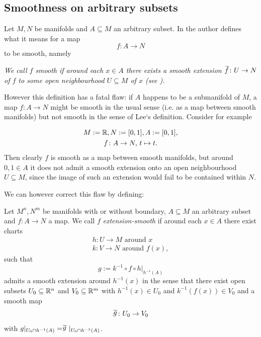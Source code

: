 \subsection{Smoothness on arbitrary subsets}

Let $M,N$ be manifolds and $A \subseteq M$ an arbitrary subset. In \cite{lee2011smooth} the author defines what it means for a map
\[
f \colon A \to N
\]
to be smooth, namely
\begin{center}
    \textit{We call $f$ smooth if around each $x \in A$ there exists a smooth extension $\oset[-1pt]{\sim}{f} \colon U \to N$ of $f$ to some open neighbourhood $U \subseteq M$ of $x$ (see \cite[p. 45]{lee2011smooth}).}
\end{center}
However this definition has a fatal flaw: if $A$ happens to be a submanifold of $M$, a map $f \colon A \to N$ might be smooth in the usual sense (i.e. as a map between smooth manifolds) but not smooth in the sense of Lee`s definition. Consider for example
\begin{counterexample}
    \label{ex:extension_smooth}
    \begin{gather*}
        M := \mathbb{R}, N:= [0,1], A := [0,1], \\
        f \colon A \to N, \, t \mapsto t.   
    \end{gather*}
    Then clearly $f$ is smooth as a map between smooth manifolds, but around $0,1 \in A$ it does not admit a smooth extension onto an open neighbourhood $U \subseteq M$, since the image of such an extension would fail to be contained within $N$. 
\end{counterexample}
We can however correct this flaw by defining:

\begin{definition}
    \label{def:extension_smooth}
    Let $M^n,N^m$ be manifolds with or without boundary, $A \subseteq M$ an arbitrary subset and $f \colon A \to N$ a map. We call $f$ \textit{extension-smooth} if around each $x \in A$ there exist charts
    \begin{gather*}
        h \colon U \to M \text{ around } x\\
        k \colon V \to N \text{ around } f(x),
    \end{gather*}
    such that
    \[
    g:= k^{-1} \circ f \circ h|_{h^{-1}(A)}
    \]
    admits a smooth extension around $h^{-1}(x)$ in the sense that there exist open subsets $U_0 \subseteq \mathbb{R}^n$ and $V_0 \subseteq \mathbb{R}^m$ with $h^{-1}(x) \in U_0$ and $k^{-1}(f(x)) \in V_0$ and a smooth map 
    \[
    \oset[-1pt]{\sim}{g} \colon U_0 \to V_0
    \]
    with $g|_{U_0 \cap h^{-1}(A)} = \oset[-1pt]{\sim}{g}|_{U_0 \cap h^{-1}(A)}$.
\end{definition}

